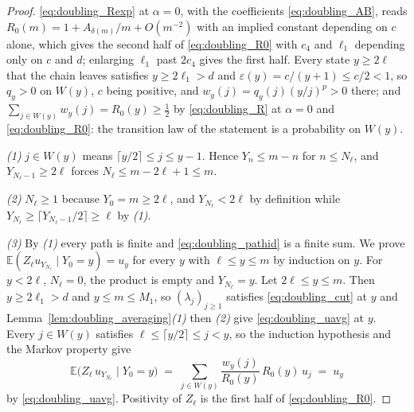 \begin{proof}
\eqref{eq:doubling_Rexp} at $\alpha=0$, with the coefficients \eqref{eq:doubling_AB}, reads
$R_0(m)=1+A_{\delta(m)}/m+O(m^{-2})$ with an implied constant depending on $c$ alone, which
gives the second half of \eqref{eq:doubling_R0} with $c_4$ and $\ell_1$ depending only on $c$
and $d$; enlarging $\ell_1$ past $2c_4$ gives the first half. Every state $y\geq2\ell$ that the
chain leaves satisfies $y\geq2\ell_1>d$ and $\varepsilon(y)=c/(y+1)\leq c/2<1$, so $q_y>0$ on
$W(y)$, $c$ being positive, and $w_y(j)=q_y(j)(y/j)^{p}>0$ there; and
$\sum_{j\in W(y)}w_y(j)=R_0(y)\geq\tfrac12$ by \eqref{eq:doubling_R} at $\alpha=0$ and
\eqref{eq:doubling_R0}: the transition law of the statement is a probability on $W(y)$.

\emph{(1)} $j\in W(y)$ means $\lceil y/2\rceil\leq j\leq y-1$. Hence $Y_n\leq m-n$ for
$n\leq N_\ell$, and $Y_{N_\ell-1}\geq2\ell$ forces $N_\ell\leq m-2\ell+1\leq m$.

\emph{(2)} $N_\ell\geq1$ because $Y_0=m\geq2\ell$, and $Y_{N_\ell}<2\ell$ by definition while
$Y_{N_\ell}\geq\lceil Y_{N_\ell-1}/2\rceil\geq\ell$ by \emph{(1)}.

\emph{(3)} By \emph{(1)} every path is finite and \eqref{eq:doubling_pathid} is a finite sum.
We prove $\mathbb E(Z_\ell u_{Y_{N_\ell}}\mid Y_0=y)=u_y$ for every $y$ with $\ell\leq y\leq m$
by induction on $y$. For $y<2\ell$, $N_\ell=0$, the product is empty and $Y_{N_\ell}=y$. Let
$2\ell\leq y\leq m$. Then $y\geq2\ell_1>d$ and $y\leq m\leq M_1$, so $(\lambda_j)_{j\geq1}$
satisfies \eqref{eq:doubling_cut} at $y$ and Lemma~\ref{lem:doubling_averaging}\emph{(1)} then
\emph{(2)} give \eqref{eq:doubling_uavg} at $y$. Every $j\in W(y)$ satisfies
$\ell\leq\lceil y/2\rceil\leq j<y$, so the induction hypothesis and the Markov property give
\begin{equation}
    \mathbb E\bigl(Z_\ell\,u_{Y_{N_\ell}}\mid Y_0=y\bigr)
    \;=\;\sum_{j\in W(y)}\frac{w_y(j)}{R_0(y)}\,R_0(y)\,u_j
    \;=\;u_y
\end{equation}
by \eqref{eq:doubling_uavg}. Positivity of $Z_\ell$ is the first half of \eqref{eq:doubling_R0}.
\end{proof}


